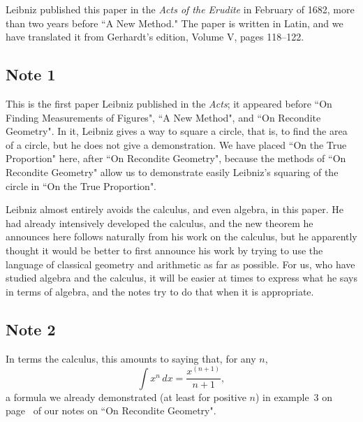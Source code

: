 \documentclass[twoside,openright]{article}
\begin{document}
Leibniz published this paper in the {\em Acts of the Erudite} in
February of 1682, more than two years before ``A New Method."  The
paper is written in Latin, and we have translated it from Gerhardt's
edition, Volume V, pages 118--122.

\subsection*{Note 1}
\label{ctp1}
This is the first paper Leibniz published in the {\em Acts}; it
appeared before ``On Finding Measurements of Figures", ``A New
Method", and ``On Recondite Geometry".  In it, Leibniz gives a way to
square a circle, that is, to find the area of a circle, but he does
not give a demonstration.  We have placed ``On the True Proportion"
here, after ``On Recondite Geometry", because the methods of ``On
Recondite Geometry" allow us to demonstrate easily Leibniz's squaring
of the circle in ``On the True Proportion".

Leibniz almost entirely avoids the calculus, and even algebra, in this
paper.  He had already intensively developed the calculus, and the new
theorem he announces here follows naturally from his work on the
calculus, but he apparently thought it would be better to first
announce his work by trying to use the language of classical geometry
and arithmetic as far as possible.  For us, who have studied algebra
and the calculus, it will be easier at times to express what he says
in terms of algebra, and the notes try to do that when it is
appropriate.

\subsection*{Note 2}
\label{ctp2}

In terms the calculus, this amounts to saying that, for any $n$,
$$\int\! x^n\,dx = \frac{x^{(n+1)}}{n+1},$$
a formula we already demonstrated (at least for positive $n$) in
example~3 on page~\pageref{intxn} of our notes on ``On Recondite
Geometry".
\end{document}

